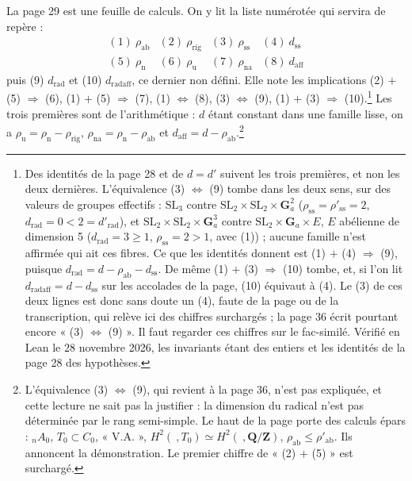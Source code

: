 \documentclass[11pt,a4paper]{article}
\begin{document}
La page 29 est une feuille de calculs. On y lit la liste numérotée qui servira
de repère :
\[
  \begin{array}{llll}
    (1)\ \rho_{\mathrm{ab}} & (2)\ \rho_{\mathrm{rig}} &
      (3)\ \rho_{\mathrm{ss}} & (4)\ d_{\mathrm{ss}} \\
    (5)\ \rho_{\mathrm{n}} & (6)\ \rho_{\mathrm{u}} &
      (7)\ \rho_{\mathrm{na}} & (8)\ d_{\mathrm{aff}}
  \end{array}
\]
puis (9) $d_{\mathrm{rad}}$ et (10) $d_{\mathrm{radaff}}$, ce dernier
non défini. Elle note les implications (2) $+$ (5) $\Rightarrow$ (6),
(1) $+$ (5) $\Rightarrow$ (7), (1) $\Leftrightarrow$ (8), (3) $\Leftrightarrow$
(9), (1) $+$ (3) $\Rightarrow$ (10).\footnote{Des identités de la page 28 et de
$d = d'$ suivent les trois premières, et non les deux dernières. L'équivalence
(3) $\Leftrightarrow$ (9) tombe dans les deux sens, sur des valeurs de groupes
effectifs : $\mathrm{SL}_{3}$ contre $\mathrm{SL}_{2} \times \mathrm{SL}_{2}
\times \mathbf{G}_{a}^{2}$ ($\rho_{\mathrm{ss}} = \rho'_{\mathrm{ss}} = 2$,
$d_{\mathrm{rad}} = 0 < 2 = d'_{\mathrm{rad}}$), et $\mathrm{SL}_{2} \times
\mathrm{SL}_{2} \times \mathbf{G}_{a}^{3}$ contre $\mathrm{SL}_{2} \times
\mathbf{G}_{a} \times E$, $E$ abélienne de dimension 5 ($d_{\mathrm{rad}} = 3
\geqslant 1$, $\rho_{\mathrm{ss}} = 2 > 1$, avec (1)) ; aucune famille n'est
affirmée qui ait ces fibres. Ce que les identités donnent est (1) $+$ (4)
$\Rightarrow$ (9), puisque $d_{\mathrm{rad}} = d - \rho_{\mathrm{ab}} -
d_{\mathrm{ss}}$. De même (1) $+$ (3) $\Rightarrow$ (10) tombe, et, si l'on lit
$d_{\mathrm{radaff}} = d - d_{\mathrm{ss}}$ sur les accolades de la page, (10)
équivaut à (4). Le (3) de ces deux lignes est donc sans doute un (4), faute de
la page ou de la transcription, qui relève ici des chiffres surchargés ; la page
36 écrit pourtant encore « (3) $\Leftrightarrow$ (9) ». Il faut regarder ces
chiffres sur le fac-similé. Vérifié en Lean le 28 novembre 2026, les invariants
étant des entiers et les identités de la page 28 des hypothèses.} Les trois premières sont de
l'arithmétique : $d$ étant constant dans une famille lisse, on a
$\rho_{\mathrm{u}} = \rho_{\mathrm{n}} - \rho_{\mathrm{rig}}$,
$\rho_{\mathrm{na}} = \rho_{\mathrm{n}} - \rho_{\mathrm{ab}}$ et
$d_{\mathrm{aff}} = d - \rho_{\mathrm{ab}}$.\footnote{L'équivalence
(3) $\Leftrightarrow$ (9), qui revient à la page 36, n'est pas expliquée, et
cette lecture ne sait pas la justifier : la dimension du radical n'est pas
déterminée par le rang semi-simple. Le haut de la page porte des calculs
épars : ${}_{n}A_{0}$, $T_{0} \subset C_{0}$, « V.A. »,
$H^{2}(\ , T_{0}) \simeq H^{2}(\ , \mathbf{Q}/\mathbf{Z})$,
$\rho_{\mathrm{ab}} \leqslant \rho'_{\mathrm{ab}}$. Ils annoncent la
démonstration. Le premier chiffre de « (2) $+$ (5) » est surchargé.}
\end{document}
